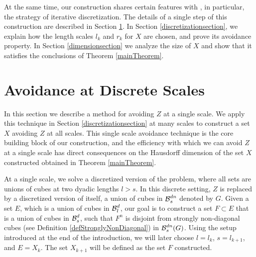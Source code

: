 At the same time, our construction shares certain features with \cite{MalabikaRob}, in particular, the strategy of iterative discretization. The details of a single step of this construction are described in Section \ref{discretesection}. In Section \ref{discretizationsection}, we explain how the length scales $l_k$ and $r_k$ for $X$ are chosen, and prove its avoidance property. In Section \ref{dimensionsection} we analyze the size of $X$ and show that it satisfies the conclusions of Theorem \ref{mainTheorem}.









\section{Avoidance at Discrete Scales}\label{discretesection}

In this section we describe a method for avoiding $Z$ at a single scale. We apply this technique in Section \ref{discretizationsection} at many scales to construct a set $X$ avoiding $Z$ at all scales. This single scale avoidance technique is the core building block of our construction, and the efficiency with which we can avoid $Z$ at a single scale has direct consequences on the Hausdorff dimension of the set $X$ constructed obtained in Theorem \ref{mainTheorem}.

At a single scale, we solve a discretized version of the problem, where all sets are unions of cubes at two dyadic lengths $l > s$. In this discrete setting, $Z$ is replaced by a discretized version of itself, a union of cubes in $\operatorname{\mathcal{B}}^{dn}_s$ denoted by $G$. Given a set $E$, which is a union of cubes in $\operatorname{\mathcal{B}}_l^d$, our goal is to construct a set $F \subset E$ that is a union of cubes in $\operatorname{\mathcal{B}}_s^d$, such that $F^n$ is disjoint from strongly non-diagonal cubes (see Definition \ref{defStronglyNonDiagonal}) in $\operatorname{\mathcal{B}}^{dn}_s(G)$. Using the setup introduced at the end of the introduction, we will later choose $l = l_k$, $s = l_{k+1}$, and $E = X_k$. The set $X_{k+1}$ will be defined as the set $F$ constructed.

